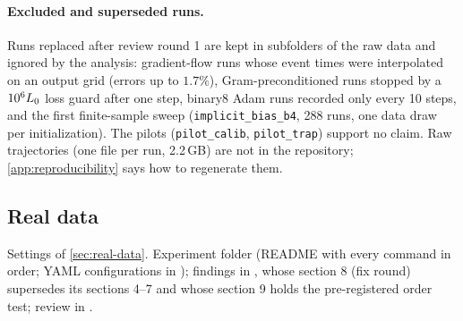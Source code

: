 \paragraph{Excluded and superseded runs.}
Runs replaced after review round 1 are kept in  subfolders of the raw data and
ignored by the analysis: gradient-flow runs whose event times were interpolated on an output grid
(errors up to $1.7\%$), Gram-preconditioned runs stopped by a $10^6L_0$ loss guard after one step,
binary8 Adam runs recorded only every 10 steps, and the first finite-sample sweep
(\texttt{implicit\_bias\_b4}, 288 runs, one data draw per initialization). The pilots
(\texttt{pilot\_calib}, \texttt{pilot\_trap}) support no claim. Raw trajectories (one file per run,
2.2\,GB) are not in the repository; \cref{app:reproducibility} says how to regenerate them.

\subsection{Real data}\label{app:exp-real-data}
Settings of \cref{sec:real-data}. Experiment folder  (README with every command
in order; YAML configurations in ); findings in , whose section 8
(fix round) supersedes its sections 4--7 and whose section 9 holds the pre-registered order test; review
in .

